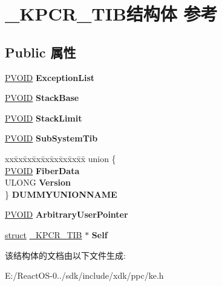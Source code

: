 \hypertarget{struct___k_p_c_r___t_i_b}{}\section{\+\_\+\+K\+P\+C\+R\+\_\+\+T\+I\+B结构体 参考}
\label{struct___k_p_c_r___t_i_b}
\subsection*{Public 属性}
\begin{DoxyCompactItemize}
\item 
\mbox{\label{struct___k_p_c_r___t_i_b_af271f7ea45f96ea18eafffa5f5506484}} 
\hyperlink{interfacevoid}{P\+V\+O\+ID} {\bfseries Exception\+List}
\item 
\mbox{\label{struct___k_p_c_r___t_i_b_ac74d913da22fa0694486a28dc93de0da}} 
\hyperlink{interfacevoid}{P\+V\+O\+ID} {\bfseries Stack\+Base}
\item 
\mbox{\label{struct___k_p_c_r___t_i_b_a209c4da72175bf3f9a5d7cc363ce5b3f}} 
\hyperlink{interfacevoid}{P\+V\+O\+ID} {\bfseries Stack\+Limit}
\item 
\mbox{\label{struct___k_p_c_r___t_i_b_ad44e2022dc3021fcc083dcad91d22369}} 
\hyperlink{interfacevoid}{P\+V\+O\+ID} {\bfseries Sub\+System\+Tib}
\item 
\mbox{\label{struct___k_p_c_r___t_i_b_afb3dbc724f3c9218fd3e5cf4295969b7}} 
\begin{tabbing}
xx\=xx\=xx\=xx\=xx\=xx\=xx\=xx\=xx\=\kill
union \{\\
\>\hyperlink{interfacevoid}{PVOID} {\bfseries FiberData}\\
\>ULONG {\bfseries Version}\\
\} {\bfseries DUMMYUNIONNAME}\\

\end{tabbing}\item 
\mbox{\label{struct___k_p_c_r___t_i_b_a8f25d586184c2b4ec17052eb61c0a6f0}} 
\hyperlink{interfacevoid}{P\+V\+O\+ID} {\bfseries Arbitrary\+User\+Pointer}
\item 
\mbox{\label{struct___k_p_c_r___t_i_b_a55a8c519b5bac3202ae148020ceb2617}} 
\hyperlink{interfacestruct}{struct} \hyperlink{struct___k_p_c_r___t_i_b}{\+\_\+\+K\+P\+C\+R\+\_\+\+T\+IB} $\ast$ {\bfseries Self}
\end{DoxyCompactItemize}


该结构体的文档由以下文件生成\+:\begin{DoxyCompactItemize}
\item 
E\+:/\+React\+O\+S-\/0../sdk/include/xdk/ppc/ke.\+h\end{DoxyCompactItemize}
